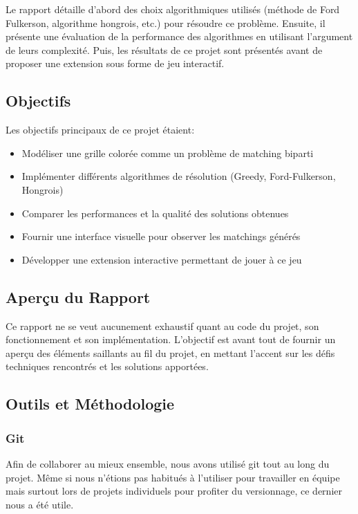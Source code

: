 \documentclass[11pt, a4paper]{article}
\begin{document}
Le rapport détaille d'abord des choix algorithmiques utilisés (méthode de Ford Fulkerson, algorithme hongrois, etc.) pour résoudre ce problème. Ensuite, il présente une évaluation de la performance des algorithmes en utilisant l'argument de leurs complexité. Puis, les résultats de ce projet sont présentés avant de proposer une extension sous forme de jeu interactif.

\subsection{Objectifs}

Les objectifs principaux de ce projet étaient:
\begin{itemize}
    \item Modéliser une grille colorée comme un problème de matching biparti
    \item Implémenter différents algorithmes de résolution (Greedy, Ford-Fulkerson, Hongrois)
    \item Comparer les performances et la qualité des solutions obtenues
    \item Fournir une interface visuelle pour observer les matchings générés
    \item Développer une extension interactive permettant de jouer à ce jeu
\end{itemize}

\subsection{Aperçu du Rapport}

Ce rapport ne se veut aucunement exhaustif quant au code du projet, son fonctionnement et son implémentation. L'objectif est avant tout de fournir un aperçu des éléments saillants au fil du projet, en mettant l'accent sur les défis techniques rencontrés et les solutions apportées.

\subsection{Outils et Méthodologie}

\subsubsection{Git}

Afin de collaborer au mieux ensemble, nous avons utilisé git tout au long du projet. Même si nous n'étions pas habitués à l'utiliser pour travailler en équipe mais surtout lors de projets individuels pour profiter du versionnage, ce dernier nous a été utile.
\end{document}
